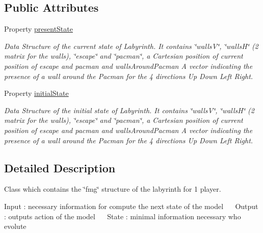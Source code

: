 \subsection*{Public Attributes}
\begin{DoxyCompactItemize}
\item 
Property \hyperlink{class_model_laby_a9624cc7c421a50fa5086b0ebd0cd5fe3}{present\+State}
\begin{DoxyCompactList}\small\item\em Data Structure of the current state of Labyrinth. It contains \char`\"{}walls\+V\char`\"{}, \char`\"{}walls\+H\char`\"{} (2 matrix for the walls), \char`\"{}escape\char`\"{} and \char`\"{}pacman\char`\"{}, a Cartesian position of current position of escape and pacman and \textquotesingle{}walls\+Around\+Pacman\textquotesingle{} A vector indicating the presence of a wall around the Pacman for the 4 directions Up Down Left Right. \end{DoxyCompactList}\item 
Property \hyperlink{class_model_laby_acd9263acfa96c9138afdf497e55acc24}{initial\+State}
\begin{DoxyCompactList}\small\item\em Data Structure of the initial state of Labyrinth. It contains \char`\"{}walls\+V\char`\"{}, \char`\"{}walls\+H\char`\"{} (2 matrix for the walls), \char`\"{}escape\char`\"{} and \char`\"{}pacman\char`\"{}, a Cartesian position of current position of escape and pacman and \textquotesingle{}walls\+Around\+Pacman\textquotesingle{} A vector indicating the presence of a wall around the Pacman for the 4 directions Up Down Left Right. \end{DoxyCompactList}\end{DoxyCompactItemize}


\subsection{Detailed Description}
Class which contains the \char`\"{}fmg\char`\"{} structure of the labyrinth for 1 player. 

Input \+: necessary information for compute the next state of the model~\newline
~\newline
 Output \+: output\textquotesingle{}s action of the model~\newline
 ~\newline
 State \+: minimal information necessary who evolute 

